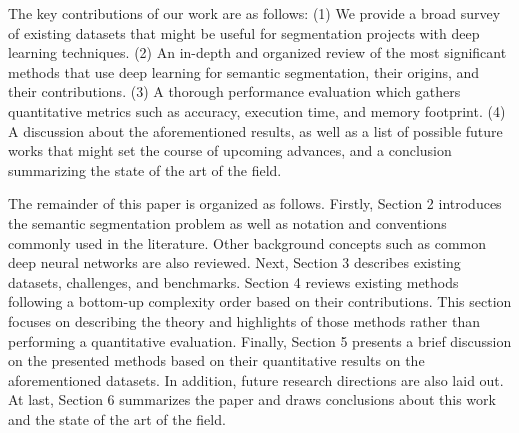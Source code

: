 The key contributions of our work are as follows:
(1) We provide a broad survey of existing datasets that might be useful for segmentation projects with deep learning techniques.
(2) An in-depth and organized review of the most signiﬁcant methods that use deep learning for semantic segmentation, their origins, and their contributions.
(3) A thorough performance evaluation which gathers quantitative metrics such as accuracy, execution time, and memory footprint.
(4) A discussion about the aforementioned results, as well as a list of possible future works that might set the course of upcoming advances, and a conclusion summarizing the state of the art of the ﬁeld.

The remainder of this paper is organized as follows. Firstly, Section 2 introduces the semantic segmentation problem as well as notation and conventions commonly used in the literature.
Other background concepts such as common deep neural networks are also reviewed. Next, Section 3 describes existing datasets, challenges, and benchmarks.
Section 4 reviews existing methods following a bottom-up complexity order based on their contributions. 
This section focuses on describing the theory and highlights of those methods rather than performing a quantitative evaluation.
Finally, Section 5 presents a brief discussion on the presented methods based on their quantitative results on the aforementioned datasets. 
In addition, future research directions are also laid out. At last, Section 6 summarizes the paper and draws conclusions about this work and the state of the art of the ﬁeld.